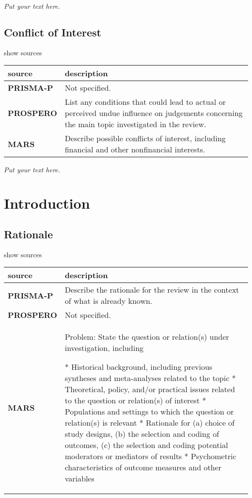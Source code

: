\documentclass[]{article}
\begin{document}
\emph{Put your text here.}

\hypertarget{conflict-of-interest}{%
\subsection{Conflict of Interest}\label{conflict-of-interest}}

show sources

\hypertarget{coi}{}
\begin{table}[H]
\centering
\begin{tabular}{>{\bfseries}l|l}
\hline
\rowcolor[HTML]{ececec}  source & description\\
\hline
PRISMA-P & Not specified.\\
\hline
PROSPERO & List any conditions that could lead to actual or perceived undue influence on judgements concerning the main topic investigated in the review.\\
\hline
MARS & Describe possible conflicts of interest, including financial and other nonfinancial interests.\\
\hline
\end{tabular}
\end{table}

\emph{Put your text here.}

\hypertarget{introduction}{%
\section{Introduction}\label{introduction}}

\hypertarget{rationale}{%
\subsection{Rationale}\label{rationale}}

show sources

\hypertarget{ram}{}
\begin{table}[H]
\centering
\begin{tabular}{>{\bfseries}l|l}
\hline
\rowcolor[HTML]{ececec}  source & description\\
\hline
PRISMA-P & Describe the rationale for the review in the context of what is already known.\\
\hline
PROSPERO & Not specified.\\
\hline
MARS & Problem: State the question or relation(s) under investigation, including

* Historical background, including previous syntheses and meta-analyses related to the topic 
* Theoretical, policy, and/or practical issues related to the question or relation(s) of interest
* Populations and settings to which the question or relation(s) is relevant
* Rationale for
   (a) choice of study designs, 
   (b) the selection and coding of outcomes, 
   (c) the selection and coding potential moderators or mediators of results 
* Psychometric characteristics of outcome measures and other variables\\
\hline
\end{tabular}
\end{table}
\end{document}
